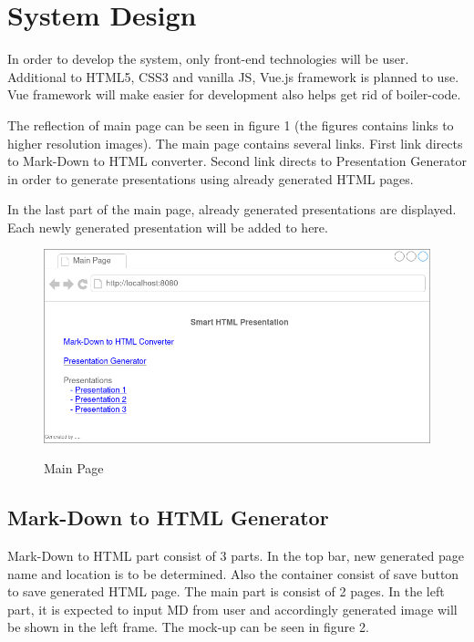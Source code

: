 \section{System Design}

In order to develop the system, only front-end technologies will be user. Additional to HTML5, CSS3 and vanilla JS, Vue.js framework is planned to use. Vue framework will make easier for development also helps get rid of boiler-code.

The reflection of main page can be seen in figure 1 (the figures contains links to higher resolution images). The main page contains several links. First link directs to Mark-Down to HTML converter. Second link directs to Presentation Generator in order to generate presentations using already generated HTML pages.

In the last part of the main page, already generated presentations are displayed. Each newly generated presentation will be added to here.

\begin{figure}[h]
    \href{https://raw.githubusercontent.com/krmacit/SWE599-Project-Report-2021S-Macit-KerimCan/master/Mockups/MainPage.png}{\includegraphics[scale=0.31]{Mockups/MainPage.png}}
    \caption{Main Page}
\end{figure}


\subsection{Mark-Down to HTML Generator}

Mark-Down to HTML part consist of 3 parts. In the top bar, new generated page name and location is to be determined. Also the container consist of save button to save generated HTML page. The main part is consist of 2 pages. In the left part, it is expected to input MD from user and accordingly generated image will be shown in the left frame. The mock-up can be seen in figure 2.

